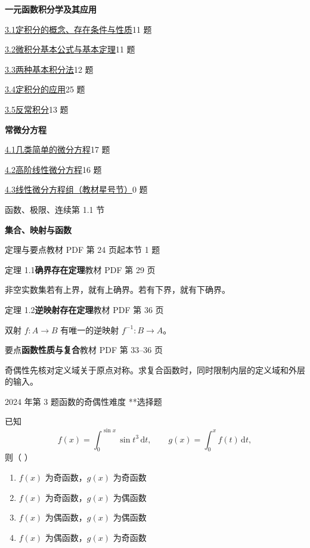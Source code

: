 \documentclass[UTF8,zihao=-4,fontset=fandol]{ctexart}
\newcommand{\SectionHeading}[4]{%
  \clearpage\hypertarget{sec-#1}{}%
  {\small\textcolor{accent}{#2\hfill 第 #1 节}}\par\medskip
  {\LARGE\bfseries #3}\par\smallskip
  {\small\textcolor{muted}{#4}}\par\bigskip}
\newcommand{\Theory}[4]{%
  {\small\textcolor{accent}{#1}\quad\textbf{#3}\hfill\textcolor{muted}{教材 PDF 第 #2 页}}\par
  {\small #4}\par\smallskip}
\newenvironment{abcd}{\begin{enumerate}[label=\textup{(\Alph*)},leftmargin=2.3em,itemsep=1pt,topsep=4pt,parsep=1pt]}{\end{enumerate}}
\newcommand{\choices}[4]{%
  \begin{abcd}
    \item #1
    \item #2
    \item #3
    \item #4
  \end{abcd}}
\newcounter{BankQuestion}
\newcommand{\QuestionPage}[7]{%
  \stepcounter{BankQuestion}%
  \par\noindent\begin{minipage}{\linewidth}
  \raggedright
  {\small\textcolor{black!60}{#3\quad #5\quad 难度 #7}\hfill\textcolor{accent}{#2}}\par\smallskip}
\newcommand{\QuestionEnd}{\end{minipage}\par\medskip}
\newcommand{\QuestionPage}[7]{%
  \clearpage
  \stepcounter{BankQuestion}%
  {\small\textcolor{accent}{#1\hfill #2}}\par\medskip
  {\small\textcolor{black!60}{#3\quad #5\quad 难度 #7\hfill \arabic{BankQuestion} / 234}}\par\vspace{9bp}}
\newcommand{\QuestionEnd}{}
\begin{document}
\begin{minipage}[t]{0.48\linewidth}
\medskip\textbf{一元函数积分学及其应用}\par
{\small\hyperlink{sec-3.1}{3.1\quad 定积分的概念、存在条件与性质}\hfill 11 题}\par
{\small\hyperlink{sec-3.2}{3.2\quad 微积分基本公式与基本定理}\hfill 11 题}\par
{\small\hyperlink{sec-3.3}{3.3\quad 两种基本积分法}\hfill 12 题}\par
{\small\hyperlink{sec-3.4}{3.4\quad 定积分的应用}\hfill 25 题}\par
{\small\hyperlink{sec-3.5}{3.5\quad 反常积分}\hfill 13 题}\par
\medskip\textbf{常微分方程}\par
{\small\hyperlink{sec-4.1}{4.1\quad 几类简单的微分方程}\hfill 17 题}\par
{\small\hyperlink{sec-4.2}{4.2\quad 高阶线性微分方程}\hfill 16 题}\par
{\small\hyperlink{sec-4.3}{4.3\quad 线性微分方程组（教材星号节）}\hfill 0 题}\par
\end{minipage}%


\SectionHeading{1.1}{函数、极限、连续}{集合、映射与函数}{定理与要点\quad 教材 PDF 第 24 页起\hfill 本节 1 题}
\Theory{定理 1.1}{29}{确界存在定理}{非空实数集若有上界，就有上确界。若有下界，就有下确界。}
\Theory{定理 1.2}{36}{逆映射存在定理}{双射 \(f\colon A\to B\) 有唯一的逆映射 \(f^{-1}\colon B\to A\)。}
\Theory{要点}{33--36}{函数性质与复合}{奇偶性先核对定义域关于原点对称。求复合函数时，同时限制内层的定义域和外层的输入。}
\QuestionPage{1.1 集合、映射与函数}{选择题}{2024 年第 3 题}{1}{函数的奇偶性}{001 / 234}{**}
已知
\[f(x)=\int_0^{\sin x}\sin t^3\,\mathrm{d}t,\qquad
g(x)=\int_0^x f(t)\,\mathrm{d}t,
\]
则（ ）
\choices{\(f(x)\) 为奇函数，\(g(x)\) 为奇函数}{\(f(x)\) 为奇函数，\(g(x)\) 为偶函数}{\(f(x)\) 为偶函数，\(g(x)\) 为偶函数}{\(f(x)\) 为偶函数，\(g(x)\) 为奇函数}
\QuestionEnd
\end{document}
